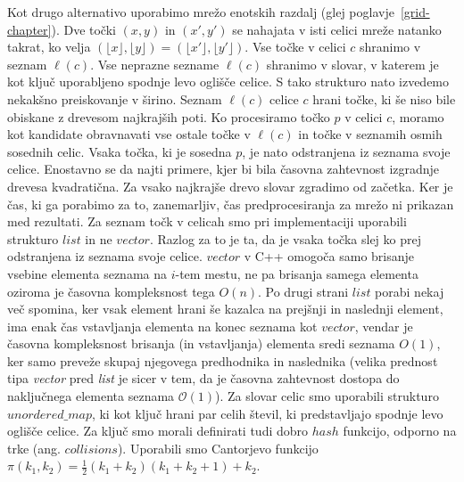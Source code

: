\documentclass[a4paper, 12pt]{book}
\newcommand{\OO}{\ensuremath{\mathcal{O}}} %
\newcommand{\U}{\texttt{\_}}
\begin{document}
Kot drugo alternativo uporabimo mrežo enotskih razdalj (glej poglavje~\ref{grid-chapter}). Dve točki $(x,y)$ in $(x',y')$ se nahajata v isti celici mreže natanko takrat, ko velja $(\lfloor x\rfloor ,\lfloor y\rfloor)=(\lfloor x'\rfloor ,\lfloor y'\rfloor)$. Vse točke v celici $c$ shranimo v seznam $\ell(c)$. Vse neprazne sezname $\ell(c)$ shranimo v slovar, v katerem je kot ključ uporabljeno spodnje levo oglišče celice. S tako strukturo nato izvedemo nekakšno preiskovanje v širino. Seznam $\ell(c)$ celice $c$ hrani točke, ki še niso bile obiskane z drevesom najkrajših poti. Ko procesiramo točko $p$ v celici $c$, moramo kot kandidate obravnavati vse ostale točke v $\ell(c)$ in točke v seznamih osmih sosednih celic. Vsaka točka, ki je sosedna $p$, je nato odstranjena iz seznama svoje celice. Enostavno se da najti primere, kjer bi bila časovna zahtevnost izgradnje drevesa kvadratična. Za vsako najkrajše drevo slovar zgradimo od začetka. Ker je čas, ki ga porabimo za to, zanemarljiv, čas predprocesiranja za mrežo ni prikazan med rezultati. Za seznam točk v celicah smo pri implementaciji uporabili strukturo $list$ in ne $vector$. Razlog za to je ta, da je vsaka točka slej ko prej odstranjena iz seznama svoje celice. $vector$ v C++ omogoča samo brisanje vsebine elementa seznama na $i$-tem mestu, ne pa brisanja samega elementa oziroma je časovna kompleksnost tega $O(n)$. Po drugi strani $list$ porabi nekaj več spomina, ker vsak element hrani še kazalca na prejšnji in naslednji element, ima enak čas vstavljanja elementa na konec seznama kot $vector$, vendar je časovna kompleksnost brisanja (in vstavljanja) elementa sredi seznama $O(1)$, ker samo preveže skupaj njegovega predhodnika in naslednika (velika prednost tipa \textit{vector} pred \textit{list} je sicer v tem, da je časovna zahtevnost dostopa do naključnega elementa seznama $\OO(1)$). Za slovar celic smo uporabili strukturo $unordered\U map$, ki kot ključ hrani par celih števil, ki predstavljajo spodnje levo oglišče celice. Za ključ smo morali definirati tudi dobro $hash$ funkcijo, odporno na trke (ang. $collisions$). Uporabili smo Cantorjevo funkcijo $\pi (k_1, k_2) = \frac{1}{2}(k_1+k_2)(k_1+k_2+1) + k_2$.
\end{document}
